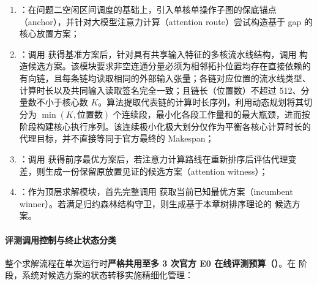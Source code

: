 \documentclass[anonymous,withtoc]{gmcm2026}
\providecommand{\tightlist}{\setlength{\itemsep}{0pt}\setlength{\parskip}{0pt}}
\begin{document}
\begin{enumerate}
\def\labelenumi{\arabic{enumi}.}
\tightlist
\item
  \textbf{\texttt{}}：在问题二空闲区间调度的基础上，引入单核单操作子图的保底锚点（anchor），并针对大模型注意力计算（attention route）尝试构造基于 gap 的核心放置方案；
\item
  \textbf{\texttt{}}：调用 \texttt{} 获得基准方案后，针对具有共享输入特征的多核流水线结构，调用 \texttt{} 构造候选方案。该模块要求非空连通分量必须为相邻拓扑位置均存在直接依赖的有向链，且每条链均读取相同的外部输入张量；各链对应位置的流水线类型、计算时长以及共同输入读取签名完全一致；且链长（位置数）不超过 512、分量数不小于核心数 \(K\)。算法提取代表链的计算时长序列，利用动态规划将其切分为 \(\min(K, \text{位置数})\) 个连续段，最小化各段工作量和的最大瓶颈，进而按阶段构建核心执行序列。该连续极小化极大划分仅作为平衡各核心计算时长的代理目标，并不直接等同于官方最终的 Makespan；
\item
  \textbf{\texttt{}}：调用 \texttt{} 获得前序最优方案后，若注意力计算路线在重新排序后评估代理变差，则生成一份保留原放置见证的候选方案（attention witness）；
\item
  \textbf{\texttt{}}：作为顶层求解模块，首先完整调用 \texttt{} 获取当前已知最优方案（incumbent winner）。若满足归约森林结构守卫，则生成基于本章树排序理论的 \texttt{} 候选方案。
\end{enumerate}

\paragraph{评测调用控制与终止状态分类}

整个求解流程在单次运行时\textbf{严格共用至多 3 次官方 E0 在线评测预算（\texttt{}）}。在 \texttt{} 阶段，系统对候选方案的状态转移实施精细化管理：
\end{document}
